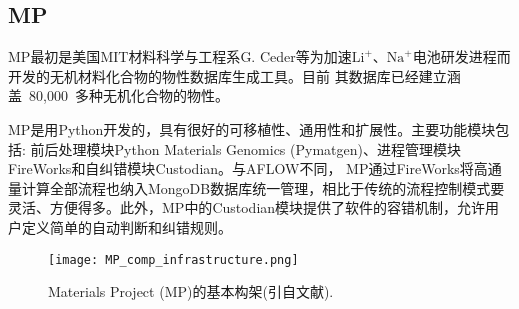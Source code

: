 \subsection{\rm{MP}}
\textrm{MP}最初是美国\textrm{MIT}材料科学与工程系\textrm{G. Ceder}等为加速$\mathrm{Li}^+$、$\mathrm{Na}^+$电池研发进程而开发的无机材料化合物的物性数据库生成工具\cite{ECC12-427_2010,JECS158-A309_2011,CMS97-209_2015}。目前 其数据库已经建立涵盖~80,000~多种无机化合物的物性。 

\textrm{MP}是用\textrm{Python}开发的，具有很好的可移植性、通用性和扩展性。主要功能模块包括: 前后处理模块\textrm{Python Materials Genomics (Pymatgen)}\cite{CMS68-314_2013}、进程管理模块\textrm{FireWorks}和自纠错模块\textrm{Custodian}。与\textrm{AFLOW}不同， \textrm{MP}通过\textrm{FireWorks}将高通量计算全部流程也纳入\textrm{MongoDB}数据库统一管理，相比于传统的流程控制模式要灵活、方便得多。此外，\textrm{MP}中的\textrm{Custodian}模块提供了软件的容错机制，允许用户定义简单的自动判断和纠错规则。
\begin{figure}[h!]
\centering
\texttt{[image: MP\_comp\_infrastructure.png]}%
\caption{\textrm{Materials Project (MP)}的基本构架(引自文献).}%
\label{Auto_Flow_Platform-2}
\end{figure}

